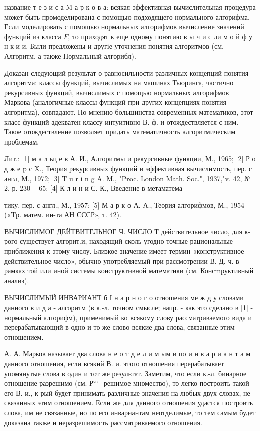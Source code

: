 \documentclass[10pt]{article}
\begin{document}
название т е з и с а $\mathrm{M}$ а р к о в а: всякая эффективная вычислительная процедура может быть промоделирована с помощью подходящего нормального алгорифма. Если моделировать с помощью нормальных алгорифмов вычисление значений функций из класса $F$, то приходят к еще одному понятию в ы ч и с ли м о й ф у н к и и. Были предложены и другіе уточнения понятия алгоритмов (см. Алгоритм, а также Нормальный алгорибл).



Доказан следующий результат о равносильности различных концепций понятия алгоритма: классы функций, вычислимых на машинах Тьюринга, частично рекурсивных функций, вычислимых с помощью нормальных алгорифмов Маркова (аналогичные классы функций при других концепциях понятия алгоритма), совпадают. По мнению большинства современных математиков, этот класс функций адекватен классу интуитивно В. ф. и отождествляется с ним. Такое отождествление позволяет придать математичность алгоритмическим проблемам.



Лит.: [1] м а л ьц е в А. И., Алгоритмы и рекурсивные функции, М., 1965; [2] Р о д ж е p с X., Теория рекурсивных функций и эффективная вычислимость, пер. с англ, М., 1972; [3] T u r i n g A. M., "Proc. London Math. Soc.", 1937,"v. 42, № 2, р. $230-65$; [4] К л и н и С. К., Введение в метаматема-

тику, пер. с англ., М., 1957; [5] М а р к о А. А., Теория алгорифмов, М., 1954 («Tр. матем. ин-та АН СССР», т. 42).



ВЫЧИСЛИМОЕ ДЕЙТВИТЕЛЬНОЕ Ч. ЧИСЛО Т действительное число, для к-рого существует алгорит.и, находящий сколь угодно точные рациональные приближения к этому числу. Близкое значение имеет термин «конструктивное действительное число», обычно употребляемый при рассмотрении В. Д. ч. в рамках той или иной системы конструктивной математики (см. Консmруктивный анализ).



ВЫЧИСЛИМЫЙ ИНВАРИАНТ б І н а р н о г о отношения ме ж д у словами данного в и д а - алгоритм (в к.-л. точном смысле; напр. - как это сделано в [1] - нормальный алгорифм), применимый ко всякому слову рассматриваемого вида и перерабатывающий в одно и то же слово всякие два слова, связанные этим отношением.



А. А. Марков называет два слова н е о т д е л и м ым и по и н в а р и а н т а м данного отношения, если всякий В. и. этого отношения перерабатывает упомянутые слова в один и тот же результат. Заметим, что если к.-л. бинарное отношение разрешимо (см. $Р{ }^{\text {чз- }}$ решимое мномество), то легко построить такой его В. и., к-рый будет принимать различные значения на любых двух словах, не связанных этим отношением. Если же для данного отношения удастся построить слова, им не связанные, но по его инвариантам неотделимые, то тем самым будет доказана также и неразрешимость рассматриваемого отношения.
\end{document}
